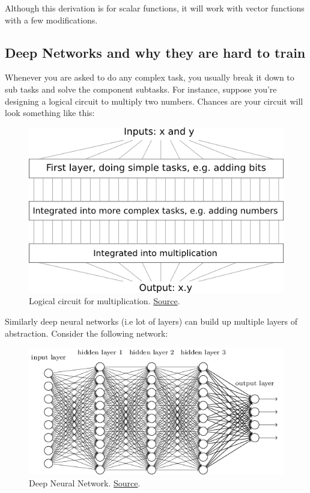 \documentclass[a4paper]{tufte-handout}
\begin{document}
Although this derivation is for scalar functions, it will work with
vector functions with a few modifications.

\subsection{Deep Networks and why they are hard to train}\label{deep-neural-networks}

Whenever you are asked to do any complex task, you usually break it down
to sub tasks and solve the component subtasks. For instance, suppose
you're designing a logical circuit to multiply two numbers. Chances are
your circuit will look something like this:

\begin{figure}
\includegraphics[width=0.7\linewidth]{circuit_multiplication}
\caption{Logical circuit for multiplication.
\href{http://neuralnetworksanddeeplearning.com/chap5.html\%22}{Source}.
}
\end{figure}

Similarly deep neural networks (i.e lot of layers) can build up multiple
layers of abstraction. Consider the following network:


\begin{figure}
\includegraphics[width=\linewidth]{tikz36}
\caption{Deep Neural Network.
\href{http://neuralnetworksanddeeplearning.com/chap5.html\%22}{Source}.}
\end{figure}
\end{document}
